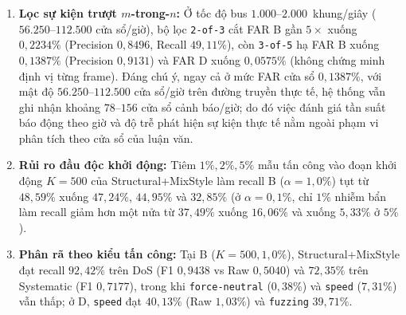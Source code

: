 \documentclass[12pt, a4paper, reqno, oneside]{book}
\DeclareRobustCommand{\code}[1]{\nolinkurl{#1}}
\begin{document}
\begin{enumerate}
    Về mặt lý thuyết xác suất, khi ước lượng ngưỡng phân vị $\tau_{\text{target}}$ từ tiền tố gộp $N_{\text{pool}} \in [3.539, 6.000]$ cửa sổ, theo bất đẳng thức Dvoretzky--Kiefer--Wolfowitz (DKW)~\cite{massart1990dkw}, với mức ý nghĩa $\delta = 0{,}05$ (độ tin cậy $95\%$), sai số đồng đều tối đa bị chặn trên bởi $\epsilon = \sqrt{\frac{\ln(2/\delta)}{2 N_{\text{pool}}}} = \sqrt{\frac{\ln(40)}{2 N_{\text{pool}}}}$, đạt mức $\epsilon \le 2{,}28\%$ tại $N_{\text{pool}}=3.539$ và thu hẹp xuống $\epsilon \le 1{,}75\%$ tại $N_{\text{pool}}=6.000$. Tại phân vị đuôi $\alpha = 1{,}0\%$, sai số chuẩn theo phân phối nhị thức $\operatorname{SE} = \sqrt{\frac{\alpha(1-\alpha)}{N_{\text{pool}}}}$ tiệm cận mức $0{,}17\%$ (với $N_{\text{pool}}=3.539$) và $0{,}13\%$ (với $N_{\text{pool}}=6.000$). Trong thực nghiệm, tỷ lệ FAR trung bình được kiểm soát tốt ở mức $\le 1{,}08\%$, nhưng có độ phân tán giữa các nền tảng: Set~3 đạt FAR thấp nhất $0{,}22\%$, trong khi Set~4 chạm mức $2{,}00\%$ (vượt khoảng tin cậy IID danh định do đặc tính phi dừng và tự tương quan chuỗi của mạng CAN). Ở $K=500, \alpha=0{,}1\%$, điều kiện $K\alpha = 0{,}5 < 1$ gây phương sai đuôi lớn hơn mức $K=1000$ ($K\alpha = 1$). Phân rã theo từng tập (Bảng~\ref{tab:cal-k-per-set}, Phụ lục~\ref{app:sensitivity}) cho thấy hiệu quả tăng mạnh ở Set~1 ($88{,}44\%$) và Set~3 ($53{,}14\%$) nhưng khiêm tốn ở Set~4 ($19{,}74\%$).
    \item \textbf{Lọc sự kiện trượt $m$-trong-$n$:} Ở tốc độ bus $1.000$--$2.000$~khung/giây ($56.250$--$112.500$ cửa sổ/giờ), bộ lọc \code{2-of-3} cắt FAR B gần $5\times$ xuống $0{,}2234\%$ (Precision $0{,}8496$, Recall $49{,}11\%$), còn \code{3-of-5} hạ FAR B xuống $0{,}1387\%$ (Precision $0{,}9131$) và FAR D xuống $0{,}0575\%$ (không chứng minh định vị từng frame). Đáng chú ý, ngay cả ở mức FAR cửa sổ $0{,}1387\%$, với mật độ $56.250\text{--}112.500$ cửa sổ/giờ trên đường truyền thực tế, hệ thống vẫn ghi nhận khoảng $78\text{--}156$ cửa sổ cảnh báo/giờ; do đó việc đánh giá tần suất báo động theo giờ và độ trễ phát hiện sự kiện thực tế nằm ngoài phạm vi phân tích theo cửa sổ của luận văn.
    \item \textbf{Rủi ro đầu độc khởi động:} Tiêm $1\%, 2\%, 5\%$ mẫu tấn công vào đoạn khởi động $K=500$ của Structural+MixStyle làm recall B ($\alpha=1{,}0\%$) tụt từ $48{,}59\%$ xuống $47{,}24\%$, $44{,}95\%$ và $32{,}85\%$ (ở $\alpha=0{,}1\%$, chỉ $1\%$ nhiễm bẩn làm recall giảm hơn một nửa từ $37{,}49\%$ xuống $16{,}06\%$ và xuống $5{,}33\%$ ở $5\%$).
    \item \textbf{Phân rã theo kiểu tấn công:} Tại B ($K=500, 1{,}0\%$), Structural+MixStyle đạt recall $92{,}42\%$ trên DoS (F1 $0{,}9438$ vs Raw $0{,}5040$) và $72{,}35\%$ trên Systematic (F1 $0{,}7177$), trong khi \code{force-neutral} ($0{,}38\%$) và \code{speed} ($7{,}31\%$) vẫn thấp; ở D, \code{speed} đạt $40{,}13\%$ (Raw $1{,}03\%$) và \code{fuzzing} $39{,}71\%$.

\end{enumerate}
\end{document}
